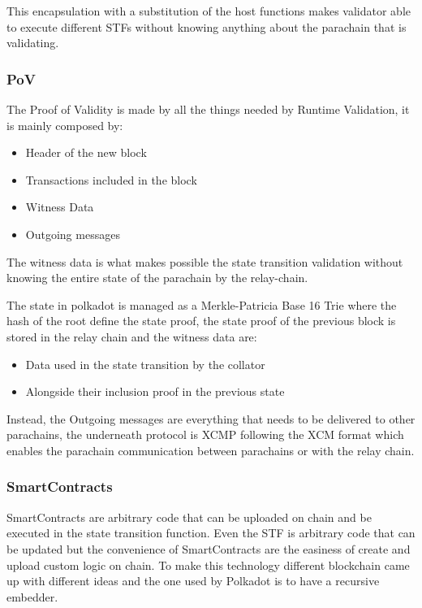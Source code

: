 \documentclass[../main.tex]{subfiles}
\begin{document}
This encapsulation with a substitution of the host functions makes  validator able to execute different STFs without knowing anything about the parachain that is validating.

\subsubsection{PoV}

The Proof of Validity is made by all the things needed by Runtime Validation, it is mainly composed by:~\cite{cumulus-docs}

\begin{itemize}
  \item Header of the new block
  \item Transactions included in the block
  \item Witness Data
  \item Outgoing messages
\end{itemize}

The witness data is what makes possible the state transition validation without knowing the entire state of the parachain by the relay-chain.

The state in polkadot is managed as a Merkle-Patricia Base 16 Trie where the hash of the root define the state proof, the state proof of the previous block is stored in the relay chain and the witness data are:

\begin{itemize}
  \item Data used in the state transition by the collator
  \item Alongside their inclusion proof in the previous state
\end{itemize}

Instead, the Outgoing messages are everything that needs to be delivered to other parachains, the underneath protocol is XCMP following the XCM format which enables the parachain communication between parachains or with the relay chain.

\subsubsection{SmartContracts}

SmartContracts are arbitrary code that can be uploaded on chain and be executed in the state transition function. Even the STF is arbitrary code that can be updated but the convenience of SmartContracts are the easiness of create and upload custom logic on chain. To make this technology different blockchain came up with different ideas and the one used by Polkadot is to have a recursive embedder.
\end{document}
